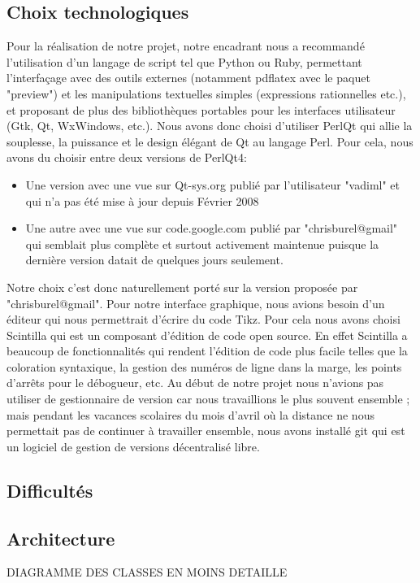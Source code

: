 \documentclass[a4paper]{report}
\begin{document}
  \subsection{Choix technologiques}
  Pour la réalisation de notre projet, notre encadrant nous a recommandé l'utilisation d'un langage de script tel que Python ou Ruby, permettant l'interfaçage avec des outils externes (notamment pdflatex avec le paquet "preview") et les manipulations textuelles simples (expressions rationnelles etc.), et proposant de plus des bibliothèques portables pour les interfaces utilisateur (Gtk, Qt, WxWindows, etc.). Nous avons donc choisi d'utiliser PerlQt qui allie la souplesse, la puissance et le design élégant de Qt au langage Perl. Pour cela, nous avons du choisir entre deux versions de PerlQt4:
\begin{itemize}
 \item Une version avec une vue sur Qt-sys.org publié par l'utilisateur "vadiml" et qui n'a pas été mise à jour depuis Février 2008
 \item Une autre avec une vue sur code.google.com publié par "chrisburel@gmail" qui semblait plus complète et surtout activement maintenue puisque la dernière version datait de quelques jours seulement.
\end{itemize}
  Notre choix c'est donc naturellement porté sur la version proposée par "chrisburel@gmail".
  \newline 
  Pour notre interface graphique, nous avions besoin d'un éditeur qui nous permettrait d'écrire du code Tikz. Pour cela nous avons choisi Scintilla qui est un composant d'édition de code open source. En effet Scintilla a beaucoup de fonctionnalités qui rendent l'édition de code plus facile telles que la coloration syntaxique, la gestion des numéros de ligne dans la marge, les points d'arrêts pour le débogueur, etc.
  \newline
  Au début de notre projet nous n'avions pas utiliser de gestionnaire de version car nous travaillions le plus souvent ensemble ; mais pendant les vacances scolaires du mois d'avril où la distance ne nous permettait pas de continuer à travailler ensemble, nous avons installé git qui est un logiciel de gestion de versions décentralisé libre. 
  \subsection{Difficultés}
  \subsection{Architecture}
  DIAGRAMME DES CLASSES EN MOINS DETAILLE   
\end{document}
